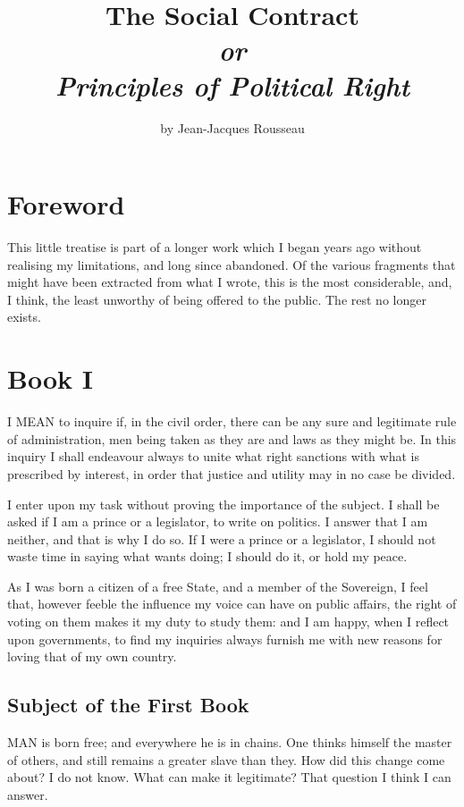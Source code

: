 \documentclass[12pt]{report}
\title{\HUGE\bfseries{The Social Contract} \\ \vspace{7mm}
\large\itshape or \\ \vspace{7mm}
\LARGE Principles of Political Right}
\author{\Large by Jean-Jacques Rousseau}
\date{\vspace{-4mm}Translated 1920 by G. D. H. Cole \\
\vfill
\epigraph{\large\itshape Foederis aequas \\ Dicamus leges}{\large Virgil,\textit{ Aeneid} XI}}
\newcommand{\mychapter}[2]{
\setcounter{chapter}{#1}
    \setcounter{section}{0}
    \chapter*{#2}
    \addcontentsline{toc}{chapter}{#2}
}
\begin{document}
\begin{titlepage}
    \maketitle
\end{titlepage}

\renewcommand*\contentsname{\vspace{-1cm} Table of Contents}
\tableofcontents

\chapter*{Foreword}
This little treatise is part of a longer work which I began years ago without realising my limitations, and long since abandoned. Of the various fragments that might have been extracted from what I wrote, this is the most considerable, and, I think, the least unworthy of being offered to the public. The rest no longer exists.

\titlespacing{\chapter}{0mm}{-2em}{1em}
\mychapter{1}{Book I}
I MEAN to inquire if, in the civil order, there can be any sure and legitimate rule of administration, men being taken as they are and laws as they might be. In this inquiry I shall endeavour always to unite what right sanctions with what is prescribed by interest, in order that justice and utility may in no case be divided.

I enter upon my task without proving the importance of the subject. I shall be asked if I am a prince or a legislator, to write on politics. I answer that I am neither, and that is why I do so. If I were a prince or a legislator, I should not waste time in saying what wants doing; I should do it, or hold my peace.

As I was born a citizen of a free State, and a member of the Sovereign, I feel that, however feeble the influence my voice can have on public affairs, the right of voting on them makes it my duty to study them: and I am happy, when I reflect upon governments, to find my inquiries always furnish me with new reasons for loving that of my own country.
\section{Subject of the First Book}
MAN is born free; and everywhere he is in chains. One thinks himself the master of others, and still remains a greater slave than they. How did this change come about? I do not know. What can make it legitimate? That question I think I can answer.
\end{document}
